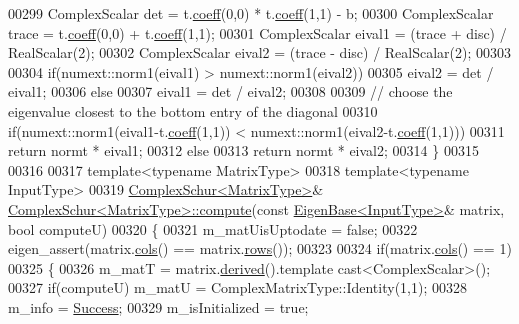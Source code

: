 \begin{DoxyCode}
00299   ComplexScalar det = t.\hyperlink{class_eigen_1_1_plain_object_base_afbfc12954f16d21aedb7bd839f64a278}{coeff}(0,0) * t.\hyperlink{class_eigen_1_1_plain_object_base_afbfc12954f16d21aedb7bd839f64a278}{coeff}(1,1) - b;
00300   ComplexScalar trace = t.\hyperlink{class_eigen_1_1_plain_object_base_afbfc12954f16d21aedb7bd839f64a278}{coeff}(0,0) + t.\hyperlink{class_eigen_1_1_plain_object_base_afbfc12954f16d21aedb7bd839f64a278}{coeff}(1,1);
00301   ComplexScalar eival1 = (trace + disc) / RealScalar(2);
00302   ComplexScalar eival2 = (trace - disc) / RealScalar(2);
00303 
00304   \textcolor{keywordflow}{if}(numext::norm1(eival1) > numext::norm1(eival2))
00305     eival2 = det / eival1;
00306   \textcolor{keywordflow}{else}
00307     eival1 = det / eival2;
00308 
00309   \textcolor{comment}{// choose the eigenvalue closest to the bottom entry of the diagonal}
00310   \textcolor{keywordflow}{if}(numext::norm1(eival1-t.\hyperlink{class_eigen_1_1_plain_object_base_afbfc12954f16d21aedb7bd839f64a278}{coeff}(1,1)) < numext::norm1(eival2-t.\hyperlink{class_eigen_1_1_plain_object_base_afbfc12954f16d21aedb7bd839f64a278}{coeff}(1,1)))
00311     \textcolor{keywordflow}{return} normt * eival1;
00312   \textcolor{keywordflow}{else}
00313     \textcolor{keywordflow}{return} normt * eival2;
00314 \}
00315 
00316 
00317 \textcolor{keyword}{template}<\textcolor{keyword}{typename} MatrixType>
00318 \textcolor{keyword}{template}<\textcolor{keyword}{typename} InputType>
00319 \hyperlink{group___eigenvalues___module}{ComplexSchur<MatrixType>}& 
      \hyperlink{group___eigenvalues___module_a3543d2c286563108cd9ace672bbb1c09}{ComplexSchur<MatrixType>::compute}(\textcolor{keyword}{const} 
      \hyperlink{group___core___module_struct_eigen_1_1_eigen_base}{EigenBase<InputType>}& matrix, \textcolor{keywordtype}{bool} computeU)
00320 \{
00321   m\_matUisUptodate = \textcolor{keyword}{false};
00322   eigen\_assert(matrix.\hyperlink{group___core___module_a7b0b45c7351847696c911ce8aa2abbdb}{cols}() == matrix.\hyperlink{group___core___module_a8141320ba8df384426c298b32b000d8e}{rows}());
00323 
00324   \textcolor{keywordflow}{if}(matrix.\hyperlink{group___core___module_a7b0b45c7351847696c911ce8aa2abbdb}{cols}() == 1)
00325   \{
00326     m\_matT = matrix.\hyperlink{group___core___module_a324b16961a11d2ecfd2d1b7dd7946545}{derived}().template cast<ComplexScalar>();
00327     \textcolor{keywordflow}{if}(computeU)  m\_matU = ComplexMatrixType::Identity(1,1);
00328     m\_info = \hyperlink{group__enums_gga85fad7b87587764e5cf6b513a9e0ee5ea52581b035f4b59c203b8ff999ef5fcea}{Success};
00329     m\_isInitialized = \textcolor{keyword}{true};

\end{DoxyCode}
